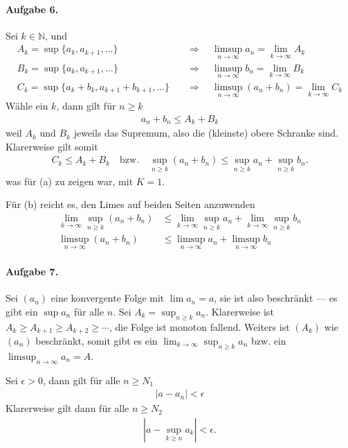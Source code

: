 \documentclass{article}
\begin{document}
\paragraph*{Aufgabe 6.}

Sei $k \in \mathbb{N}$, und
\begin{align*}
    A_k = \sup \{a_k, a_{k + 1}, \ldots\} \quad &\Longrightarrow \quad \limsup_{n \to \infty} a_n = \lim_{k \to \infty} A_k \\
    B_k = \sup \{a_k, a_{k + 1}, \ldots\} \quad &\Longrightarrow \quad \limsup_{n \to \infty} b_n = \lim_{k \to \infty} B_k \\
    C_k = \sup \{a_k + b_k, a_{k + 1} + b_{k + 1}, \ldots\} \quad &\Longrightarrow \quad \limsup_{n \to \infty} (a_n + b_n) = \lim_{k \to \infty} C_k
\end{align*}
Wähle ein $k$, dann gilt für $n \geq k$
\begin{align*}
    a_n + b_n \leq A_k + B_k
\end{align*}
weil $A_k$ und $B_k$ jeweils das Supremum, also die (kleinste) obere Schranke sind. Klarerweise gilt somit
\begin{align*}
    C_k \leq A_k + B_k \quad \text{bzw.} \quad \sup_{n \geq k} (a_n + b_n) \leq \sup_{n \geq k} a_n + \sup_{n \geq k} b_n.
\end{align*}
was für (a) zu zeigen war, mit $K = 1$.

Für (b) reicht es, den Limes auf beiden Seiten anzuwenden
\begin{align*}
    \lim_{k \to \infty} \sup_{n \geq k} (a_n + b_n) &\leq \lim_{k \to \infty} \sup_{n \geq k} a_n + \lim_{k \to \infty} \sup_{n \geq k} b_n \\
    \limsup_{n \to \infty} (a_n + b_n) &\leq \limsup_{n \to \infty} a_n + \limsup_{n \to \infty} b_n
\end{align*}

\paragraph*{Aufgabe 7.}

Sei $(a_n)$ eine konvergente Folge mit $\lim a_n = a$, sie ist also beschränkt --- es gibt ein $\sup a_n$ für alle $n$. Sei $A_k = \sup_{n \geq k} a_n$. Klarerweise ist $A_k \geq A_{k + 1} \geq A_{k + 2} \geq \cdots$, die Folge ist monoton fallend. Weiters ist $(A_k)$ wie $(a_n)$ beschränkt, somit gibt es ein $\lim_{k \to \infty}\sup_{n \geq k}a_n$ bzw. ein $\limsup_{n \to \infty}a_n = A$.

Sei $\epsilon > 0$, dann gilt für alle $n \geq N_1$
\begin{align*}
    |a - a_n| < \epsilon
\end{align*}
Klarerweise gilt dann für alle $n \geq N_2$
\begin{align*}
    |a - \sup_{k \geq n} a_k| < \epsilon.
\end{align*}
\end{document}
